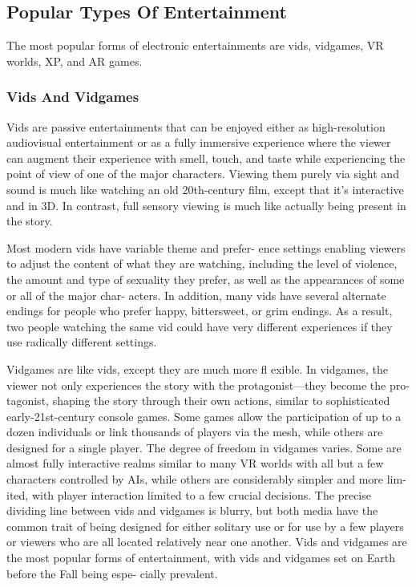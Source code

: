 \subsection{Popular Types Of Entertainment}

The most popular forms of electronic entertainments 
are vids, vidgames, VR worlds, XP, and AR games.

\subsubsection{Vids And Vidgames}

Vids are passive entertainments that can be enjoyed 
either as high-resolution audiovisual entertainment or 
as a fully immersive experience where the viewer can 
augment their experience with smell, touch, and taste 
while experiencing the point of view of one of the 
major characters. Viewing them purely via sight and 
sound is much like watching an old 20th-century film, 
except that it's interactive and in 3D. In contrast, full 
sensory viewing is much like actually being present in 
the story.

Most modern vids have variable theme and prefer-
ence settings enabling viewers to adjust the content of 
what they are watching, including the level of violence, 
the amount and type of sexuality they prefer, as well 
as the appearances of some or all of the major char-
acters. In addition, many vids have several alternate 
endings for people who prefer happy, bittersweet, or 
grim endings. As a result, two people watching the 
same vid could have very different experiences if they 
use radically different settings.

Vidgames are like vids, except they are much more 
fl exible. In vidgames, the viewer not only experiences 
the story with the protagonist—they become the pro-
tagonist, shaping the story through their own actions, 
similar to sophisticated early-21st-century console 
games. Some games allow the participation of up to a 
dozen individuals or link thousands of players via the 
mesh, while others are designed for a single player. 
The degree of freedom in vidgames varies. Some are 
almost fully interactive realms similar to many VR 
worlds with all but a few characters controlled by AIs, 
while others are considerably simpler and more lim-
ited, with player interaction limited to a few crucial 
decisions. The precise dividing line between vids and 
vidgames is blurry, but both media have the common 
trait of being designed for either solitary use or for 
use by a few players or viewers who are all located 
relatively near one another. Vids and vidgames are 
the most popular forms of entertainment, with vids 
and vidgames set on Earth before the Fall being espe-
cially prevalent.

